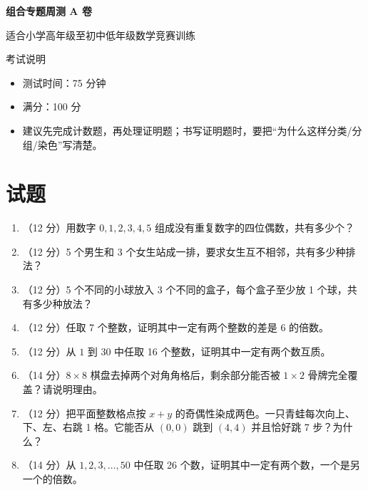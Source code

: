 \documentclass[11pt,a4paper,fontset=fandol]{ctexart}
\newcommand{\answerspace}{\vspace{2.4cm}}
\newcommand{\biganswerspace}{\vspace{3.2cm}}
\begin{document}
\thispagestyle{empty}
\begin{center}
{\fontsize{22}{28}\selectfont\bfseries 组合专题周测 A 卷\par}
\vspace{0.4cm}
{\large 适合小学高年级至初中低年级数学竞赛训练\par}
\end{center}

\begin{infobox}{考试说明}
\begin{itemize}
  \item 测试时间：75 分钟
  \item 满分：100 分
  \item 建议先完成计数题，再处理证明题；书写证明题时，要把“为什么这样分类/分组/染色”写清楚。
\end{itemize}
\end{infobox}

\section{试题}

\begin{enumerate}
  \item （12 分）用数字 $0,1,2,3,4,5$ 组成没有重复数字的四位偶数，共有多少个？
  \answerspace

  \item （12 分）5 个男生和 3 个女生站成一排，要求女生互不相邻，共有多少种排法？
  \answerspace

  \item （12 分）5 个不同的小球放入 3 个不同的盒子，每个盒子至少放 1 个球，共有多少种放法？
  \biganswerspace

  \item （12 分）任取 7 个整数，证明其中一定有两个整数的差是 6 的倍数。
  \answerspace

  \item （12 分）从 $1$ 到 $30$ 中任取 16 个整数，证明其中一定有两个数互质。
  \answerspace

  \item （14 分）$8\times 8$ 棋盘去掉两个对角角格后，剩余部分能否被 $1\times 2$ 骨牌完全覆盖？请说明理由。
  \biganswerspace

  \item （12 分）把平面整数格点按 $x+y$ 的奇偶性染成两色。一只青蛙每次向上、下、左、右跳 1 格。它能否从 $(0,0)$ 跳到 $(4,4)$ 并且恰好跳 7 步？为什么？
  \answerspace

  \item （14 分）从 $1,2,3,\ldots,50$ 中任取 26 个数，证明其中一定有两个数，一个是另一个的倍数。
  \biganswerspace
\end{enumerate}
\end{document}
